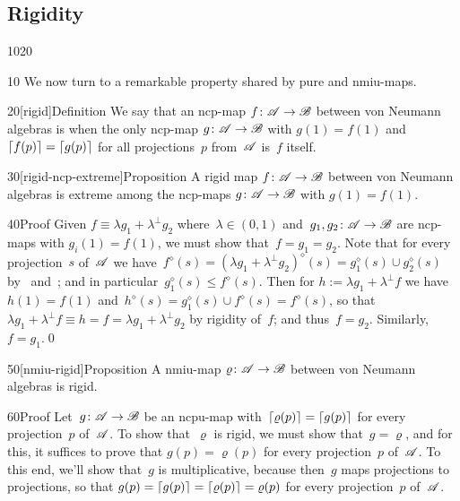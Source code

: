 \subsection{Rigidity}
\begin{parsec}{1020}%
\begin{point}{10}%
We now turn to  a remarkable property shared
by pure and nmiu-maps.
\end{point}
\begin{point}{20}[rigid]{Definition}%
We say that an ncp-map $f\colon \mathscr{A}\to\mathscr{B}$
between von Neumann algebras is %
when the only ncp-map $g\colon \mathscr{A}\to\mathscr{B}$
with $g(1)=f(1)$ and $\left\lceil f(p)\right\rceil=\left\lceil g(p)\right\rceil$ for all
projections~$p$ from~$\mathscr{A}$ is~$f$ itself.
\end{point}
\begin{point}{30}[rigid-ncp-extreme]{Proposition}%
A rigid map $f\colon \mathscr{A}\to\mathscr{B}$
between von Neumann algebras
is extreme among the ncp-maps $g\colon \mathscr{A}\to\mathscr{B}$
with $g(1)=f(1)$.
\begin{point}{40}{Proof}%
Given $f\equiv \lambda g_1 + \lambda^\perp g_2$
where~$\lambda\in(0,1)$ 
and~$g_1,g_2\colon \mathscr{A}\to\mathscr{B}$
are ncp-maps with $g_i(1)=f(1)$,
we must show that~$f=g_1=g_2$.
Note that for every projection~$s$
of~$\mathscr{A}$
we have~$f^\diamond(s) = (\lambda g_1+\lambda^\perp g_2)^\diamond(s)
= g_1^\diamond(s)\cup g_2^\diamond(s)$
by~ and~;
and in particular~$g_1^\diamond(s)\leq f^\diamond(s)$.
Then for $h:=\lambda  g_1 + \lambda^\perp f$
we have $h(1)=f(1)$
and~$h^\diamond(s) = g_1^\diamond(s)\cup f^\diamond(s)
= f^\diamond(s)$,
so that~$\lambda g_1 + \lambda^\perp f \equiv 
h=f = \lambda g_1 +\lambda^\perp g_2$ by rigidity of~$f$;
and thus~$f=g_2$.
Similarly, $f=g_1$.\qed%
\end{point}
\end{point}
\begin{point}{50}[nmiu-rigid]{Proposition}%
A nmiu-map $\varrho\colon \mathscr{A}\to\mathscr{B}$
between von Neumann algebras is rigid.
\begin{point}{60}{Proof}%
Let~$g\colon \mathscr{A}\to\mathscr{B}$
be an ncpu-map
with~$\left\lceil\varrho(p)\right\rceil=\left\lceil g(p)\right\rceil$
for every projection~$p$ of~$\mathscr{A}$.
To show that~$\varrho$ is rigid,
we must show that~$g=\varrho$,
and for this, it suffices to prove that $g(p)=\varrho(p)$
for every projection~$p$ of~$\mathscr{A}$.
To this end, we'll show that~$g$ is multiplicative,
because then~$g$ maps projections to projections,
so that $g(p)=\left\lceil g(p)\right\rceil=\left\lceil\varrho(p)\right\rceil=\varrho(p)$
for every projection~$p$ of~$\mathscr{A}$.

\end{point}
\end{point}
\end{parsec}
